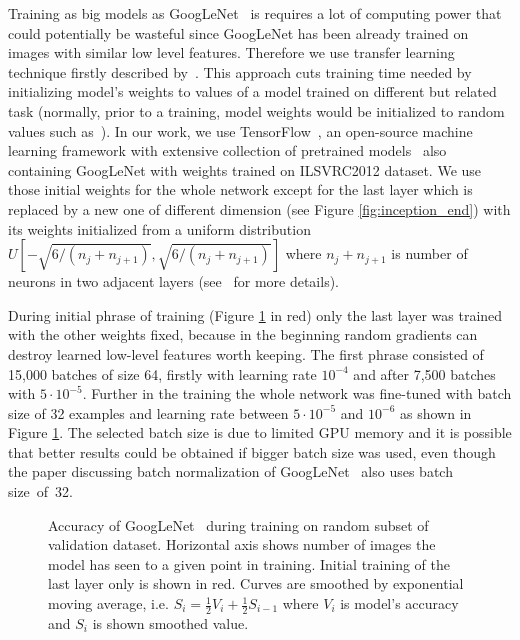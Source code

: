 Training as big models as GoogLeNet~\cite{szegedy2015going} is requires a lot of computing power that could potentially be wasteful since GoogLeNet has been already trained on images with similar low level features. Therefore we use transfer learning technique firstly described by~\cite{donahue2014decaf}. This approach cuts training time needed by initializing model's weights to values of a model trained on different but related task (normally, prior to a training, model weights would be initialized to random values such as~\cite{glorot2010understanding}). In our work, we use TensorFlow~\cite{tensorflow2015}, an open-source machine learning framework with extensive collection of pretrained models~\cite{TFmodels} also containing GoogLeNet with weights trained on ILSVRC2012 dataset. We use those initial weights for the whole network except for the last layer which is replaced by a new one of different dimension (see Figure \ref{fig:inception_end}) with its weights initialized from a uniform distribution $U\left[-\sqrt{6/(n_j+n_{j+1})}, \sqrt{6/(n_j+n_{j+1})}\right]$ where $n_j+n_{j+1}$ is number of neurons in two adjacent layers (see~\cite{glorot2010understanding} for more details).

During initial phrase of training (Figure \ref{fig:train_progress} in red) only the last layer was trained with the other weights fixed, because in the beginning random gradients can destroy learned low-level features worth keeping. The first phrase consisted of 15,000 batches of size 64, firstly with learning rate $10^{-4}$ and after 7,500 batches with $5\cdot 10^{-5}$. Further in the training the whole network was fine-tuned with batch size of 32 examples and learning rate between $5\cdot 10^{-5}$ and $10^{-6}$ as shown in Figure \ref{fig:train_progress}. The selected batch size is due to limited GPU memory and it is possible that better results could be obtained if bigger batch size was used, even though the paper discussing batch normalization of GoogLeNet~\cite{ioffe2015batch} also uses batch size~of~32.


\begin{figure}
	\centering
	
	
	\caption[Accuracy of GoogLeNet during training]{Accuracy of GoogLeNet~\cite{szegedy2015going} during training on random subset of validation dataset. Horizontal axis shows number of images the model has seen to a given point in training. Initial training of the last layer only is shown in red. Curves are smoothed by exponential moving average, i.e. $S_i=\frac{1}{2}V_i + \frac{1}{2}S_{i-1}$ where $V_i$ is model's accuracy and $S_i$ is shown smoothed value.}
	\label{fig:train_progress}
\end{figure}

